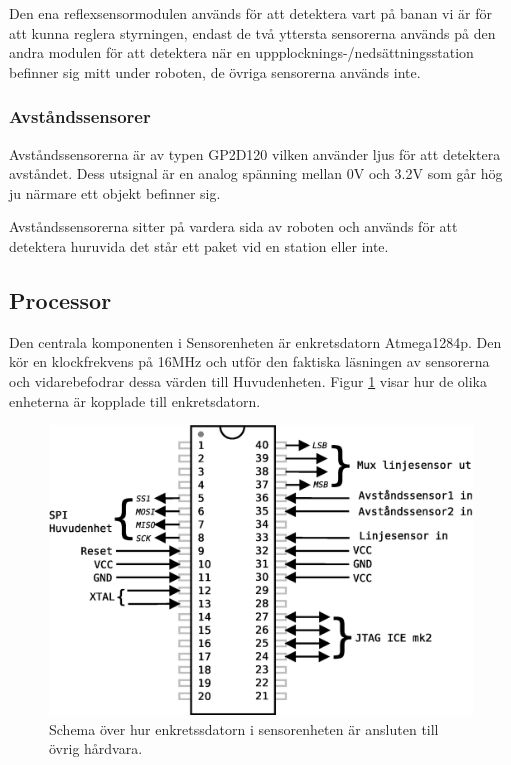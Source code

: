 Den ena reflexsensormodulen används för att detektera vart på banan vi är för att kunna reglera styrningen, endast de två yttersta sensorerna används på den andra modulen för att detektera när en uppplocknings-/nedsättningsstation befinner sig mitt under roboten, de övriga sensorerna används inte.

\subsubsection{Avståndssensorer}
Avståndssensorerna är av typen GP2D120 vilken använder ljus för att detektera avståndet. Dess utsignal är en analog spänning mellan 0V och 3.2V som går hög ju närmare ett objekt befinner sig. 

Avståndssensorerna sitter på vardera sida av roboten och används för att detektera huruvida det står ett paket vid en station eller inte.


\subsection{Processor}
Den centrala komponenten i Sensorenheten är enkretsdatorn Atmega1284p. Den kör en klockfrekvens på 16MHz och utför den faktiska läsningen av sensorerna och vidarebefodrar dessa värden till Huvudenheten. Figur \ref{sensor-processor} visar hur de olika enheterna är kopplade till enkretsdatorn.

\begin{figure}[h!]
	\centering
	\includegraphics[scale=0.5]{grafik/sensorenhet-processor}
	\caption{Schema över hur enkretssdatorn i sensorenheten är ansluten till övrig hårdvara.} \label{sensor-processor}
\end{figure}

